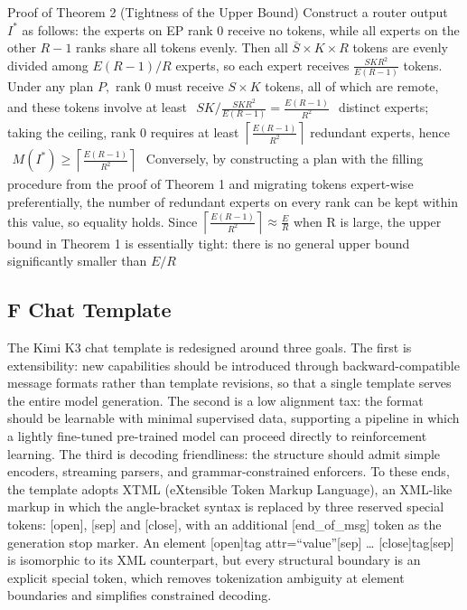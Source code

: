 \documentclass[
  10
]{article}
\begin{document}
Proof of Theorem 2 (Tightness of the Upper Bound) Construct a router
output \(I ^ { * }\) as follows: the experts on EP rank 0 receive no
tokens, while all experts on the other \(R - 1\) ranks share all tokens
evenly. Then all \({ \bar { S } } \times K \times R\) tokens are evenly
divided among \(E ( R - 1 ) / R\) experts, so each expert receives
\(\frac { S K R ^ { 2 } } { E ( R - 1 ) }\) tokens. Under any plan
\(P ,\) rank 0 must receive \(S \times K\) tokens, all of which are
remote, and these tokens involve at least
\(\begin{array} { r } { S K / \frac { S K R ^ { 2 } } { E ( R - 1 ) } = \frac { E ( R - 1 ) } { R ^ { 2 } } } \end{array}\)
distinct experts; taking the ceiling, rank 0 requires at least
\(\textstyle \left\lceil { \frac { E ( R - 1 ) } { R ^ { 2 } } } \right\rceil\)
redundant experts, hence
\(\begin{array} { r } { M ( I ^ { * } ) \geq \left\lceil \frac { E ( R - 1 ) } { R ^ { 2 } } \right\rceil } \end{array}\)
Conversely, by constructing a plan with the filling procedure from the
proof of Theorem 1 and migrating tokens expert-wise preferentially, the
number of redundant experts on every rank can be kept within this value,
so equality holds. Since
\(\textstyle \left\lceil { \frac { E ( R - 1 ) } { R ^ { 2 } } } \right\rceil \approx { \frac { E } { R } }\)
when R is large, the upper bound in Theorem 1 is essentially tight:
there is no general upper bound significantly smaller than \(E / R\)

\subsection{F Chat Template}\label{f-chat-template}

The Kimi K3 chat template is redesigned around three goals. The first is
extensibility: new capabilities should be introduced through
backward-compatible message formats rather than template revisions, so
that a single template serves the entire model generation. The second is
a low alignment tax: the format should be learnable with minimal
supervised data, supporting a pipeline in which a lightly fine-tuned
pre-trained model can proceed directly to reinforcement learning. The
third is decoding friendliness: the structure should admit simple
encoders, streaming parsers, and grammar-constrained enforcers. To these
ends, the template adopts XTML (eXtensible Token Markup Language), an
XML-like markup in which the angle-bracket syntax is replaced by three
reserved special tokens: {[}open{]}, {[}sep{]} and {[}close{]}, with an
additional {[}end\_of\_msg{]} token as the generation stop marker. An
element {[}open{]}tag attr=``value''{[}sep{]} \ldots{}
{[}close{]}tag{[}sep{]} is isomorphic to its XML counterpart, but every
structural boundary is an explicit special token, which removes
tokenization ambiguity at element boundaries and simplifies constrained
decoding.
\end{document}
